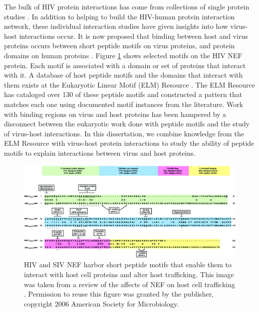 The bulk of HIV protein interactions has come from collections of
single protein studies \cite{mendez2010global, chatr08, ptak08,
  driscoll2009pig}. In addition to helping to build the HIV-human
protein interaction network, these individual interaction studies have
given insights into how virus-host interactions occur. It is now
proposed that binding between host and virus proteins occurs between
short peptide motifs on virus proteins, and protein domains on human
proteins \cite{tonikian08,shelton08,kadaveru08}. Figure
\ref{fig:intro:nef} shows selected motifs on the HIV NEF protein. Each
motif is associated with a domain or set of proteins that interact
with it. A database of host peptide motifs and the domains that
interact with them exists at the Eukaryotic Linear Motif (ELM)
Resource \cite{puntervoll03}. The ELM Resource has cataloged over 130
of these peptide motifs and constructed a pattern that matches each
one using documented motif instances from the literature.  Work with
binding regions on virus and host proteins has been hampered by a
disconnect between the eukaryotic work done with peptide motifs and
the study of virus-host interactions. In this dissertation, we combine
knowledge from the ELM Resource with virus-host protein interactions
to study the ability of peptide motifs to explain interactions between
virus and host proteins.

\begin{figure}
\begin{center}
\includegraphics[scale=0.25]{figs/intro_nef}
\end{center}
\caption[Host peptide motifs on HIV NEF]{\small HIV and SIV NEF harbor
  short peptide motifs that enable them to interact with host cell
  proteins and alter host trafficking. This image was taken from a
  review of the affects of NEF on host cell trafficking
  \cite{roeth06}. Permission to reuse this figure was granted by the
  publisher, copyright 2006 American Society for
  Microbiology. \label{fig:intro:nef}}
\end{figure}

